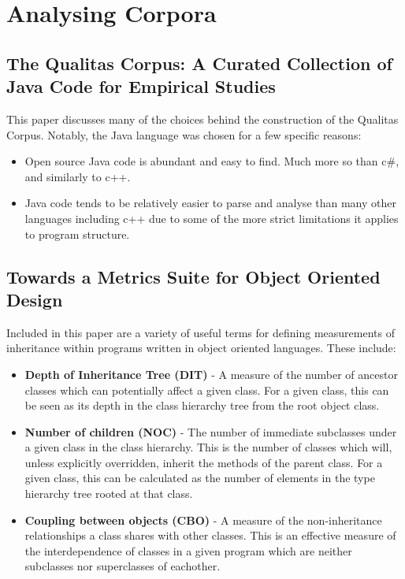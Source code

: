 \section{Analysing Corpora}
\subsection{The Qualitas Corpus: A Curated Collection of Java Code for Empirical Studies~\cite{QualitasCorpus}}
This paper discusses many of the choices behind the construction of the Qualitas Corpus. Notably, the Java language was chosen for a few specific reasons:
\begin{itemize}
	\item Open source Java code is abundant and easy to find. Much more so than c\#, and similarly to c++.
	\item Java code tends to be relatively easier to parse and analyse than many other languages including c++ due to some of the more strict limitations it applies to program structure.
\end{itemize}

\subsection{Towards a Metrics Suite for Object Oriented Design~\cite{MetricsSuite}}
Included in this paper are a variety of useful terms for defining measurements of inheritance within programs written in object oriented languages. These include:
\begin{itemize}
	\item \textbf{Depth of Inheritance Tree (DIT)} - A measure of the number of ancestor classes which can potentially affect a given class. For a given class, this can be seen as its depth in the class hierarchy tree from the root object class.
	\item \textbf{Number of children (NOC)} - The number of immediate subclasses under a given class in the class hierarchy. This is the number of classes which will, unless explicitly overridden, inherit the methods of the parent class. For a given class, this can be calculated as the number of elements in the type hierarchy tree rooted at that class. 
	\item \textbf{Coupling between objects (CBO)} - A measure of the non-inheritance relationships a class shares with other classes. This is an effective measure of the interdependence of classes in a given program which are neither subclasses nor superclasses of eachother.
\end{itemize}

